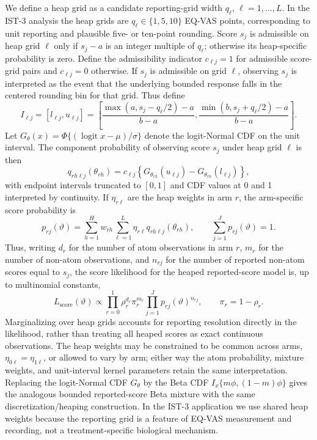 \documentclass[11pt]{article}
\DeclareMathOperator*{\logit}{logit}
\begin{document}
We define a heap grid as a candidate reporting-grid width $q_\ell$, $\ell=1,\ldots,L$. In the IST-3 analysis the heap grids are $q_\ell\in\{1,5,10\}$ EQ-VAS points, corresponding to unit reporting and plausible five- or ten-point rounding. Score $s_j$ is admissible on heap grid $\ell$ only if $s_j-a$ is an integer multiple of $q_\ell$; otherwise its heap-specific probability is zero. Define the admissibility indicator $c_{\ell j}=1$ for admissible score-grid pairs and $c_{\ell j}=0$ otherwise. If $s_j$ is admissible on grid $\ell$, observing $s_j$ is interpreted as the event that the underlying bounded response falls in the centered rounding bin for that grid. Thus define
\[
  I_{\ell j}
  =
  [l_{\ell j},u_{\ell j}]
  =
  \left[
    \frac{\max(a,s_j-q_\ell/2)-a}{b-a},
    \frac{\min(b,s_j+q_\ell/2)-a}{b-a}
  \right].
\]
Let $G_\theta(x)=\Phi\{(\logit x-\mu)/\sigma\}$ denote the logit-Normal CDF on the unit interval. The component probability of observing score $s_j$ under heap grid $\ell$ is then
\[
  q_{rh\ell j}(\theta_{rh})
  =
  c_{\ell j}
  \left\{
    G_{\theta_{rh}}(u_{\ell j}) - G_{\theta_{rh}}(l_{\ell j})
  \right\},
\]
with endpoint intervals truncated to $[0,1]$ and CDF values at 0 and 1 interpreted by continuity. If $\eta_{r\ell}$ are the heap weights in arm $r$, the arm-specific score probability is
\[
  p_{rj}(\vartheta)
  =
  \sum_{h=1}^{H} w_{rh}
  \sum_{\ell=1}^{L}\eta_{r\ell} q_{rh\ell j}(\theta_{rh}),
  \qquad
  \sum_{j=1}^{J}p_{rj}(\vartheta)=1.
\]
Thus, writing $d_r$ for the number of atom observations in arm $r$, $m_r$ for the number of non-atom observations, and $n_{rj}$ for the number of reported non-atom scores equal to $s_j$, the score likelihood for the heaped reported-score model is, up to multinomial constants,
\[
  L_{\mathrm{score}}(\vartheta)
  \propto
  \prod_{r=0}^{1}
  \rho_r^{d_r}\pi_r^{m_r}
  \prod_{j=1}^{J}
  p_{rj}(\vartheta)^{n_{rj}},
  \qquad
  \pi_r=1-\rho_r.
\]
Marginalizing over heap grids accounts for reporting resolution directly in the likelihood, rather than treating all heaped scores as exact continuous observations. The heap weights may be constrained to be common across arms, $\eta_{0\ell}=\eta_{1\ell}$, or allowed to vary by arm; either way the atom probability, mixture weights, and unit-interval kernel parameters retain the same interpretation. Replacing the logit-Normal CDF $G_\theta$ by the Beta CDF $I_x\{m\phi,(1-m)\phi\}$ gives the analogous bounded reported-score Beta mixture with the same discretization/heaping construction. In the IST-3 application we use shared heap weights because the reporting grid is a feature of EQ-VAS measurement and recording, not a treatment-specific biological mechanism.
\end{document}
